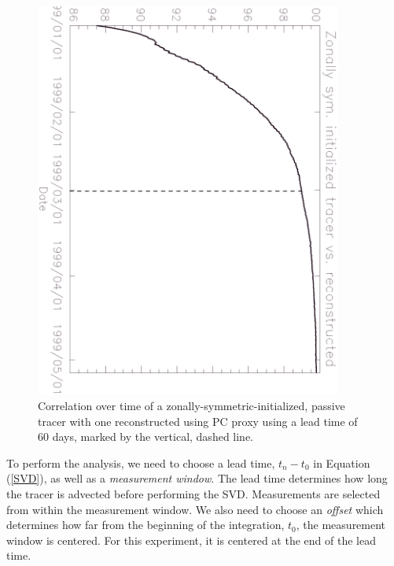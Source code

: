\documentclass{article}
\begin{document}
\begin{figure}
\begin{center}
\includegraphics[angle=90, width=0.9\textwidth]{../pc_proxy/proxycorr.eps}
\caption{Correlation over time of a zonally-symmetric-initialized, passive tracer
with one reconstructed using PC proxy using a lead time of 60 days,
marked by the vertical, dashed line.}\label{PCproxytest}
\end{center}
\end{figure}

To perform the analysis, we need to choose a lead time, 
$t_n-t_0$ in Equation (\ref{SVD}), as well as
a \textit{measurement window}.
The lead time determines how long the tracer is advected before performing
the SVD.
Measurements are selected from within the measurement window.
We also need to choose an {\it offset} which determines how far from the
beginning of the integration, $t_0$, the measurement window is centered.
For this experiment, it is centered at the end of the lead time.
\end{document}

